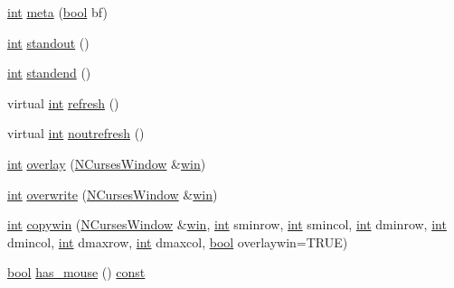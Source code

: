 \begin{DoxyCompactItemize}
\item 
\hyperlink{term__entry_8h_ad65b480f8c8270356b45a9890f6499ae}{int} \hyperlink{class_n_curses_window_a8e0a0dcfd1bd1648ea35724200664e4b}{meta} (\hyperlink{term__entry_8h_a002004ba5d663f149f6c38064926abac}{bool} bf)
\item 
\hyperlink{term__entry_8h_ad65b480f8c8270356b45a9890f6499ae}{int} \hyperlink{class_n_curses_window_ac6d8530fa9b03de2f08d8f24b70764b5}{standout} ()
\item 
\hyperlink{term__entry_8h_ad65b480f8c8270356b45a9890f6499ae}{int} \hyperlink{class_n_curses_window_ae66f15f4d0cfcc59374d5087d59211c2}{standend} ()
\item 
virtual \hyperlink{term__entry_8h_ad65b480f8c8270356b45a9890f6499ae}{int} \hyperlink{class_n_curses_window_a98862f6bbcabadb168dcf4b46d1369fc}{refresh} ()
\item 
virtual \hyperlink{term__entry_8h_ad65b480f8c8270356b45a9890f6499ae}{int} \hyperlink{class_n_curses_window_a8b2c23bf8acdada2b0dbb06f870009bb}{noutrefresh} ()
\item 
\hyperlink{term__entry_8h_ad65b480f8c8270356b45a9890f6499ae}{int} \hyperlink{class_n_curses_window_a94e231c3c169adcb377a5a7fa8ea1f16}{overlay} (\hyperlink{class_n_curses_window}{N\-Curses\-Window} \&\hyperlink{_ndk_8cpp_a3b51c79a7f111d2be9d347ac9bfe3abd}{win})
\item 
\hyperlink{term__entry_8h_ad65b480f8c8270356b45a9890f6499ae}{int} \hyperlink{class_n_curses_window_a93a33b695e6720f7a3a3bbd7c8c2c67b}{overwrite} (\hyperlink{class_n_curses_window}{N\-Curses\-Window} \&\hyperlink{_ndk_8cpp_a3b51c79a7f111d2be9d347ac9bfe3abd}{win})
\item 
\hyperlink{term__entry_8h_ad65b480f8c8270356b45a9890f6499ae}{int} \hyperlink{class_n_curses_window_a182aa3516f9c714b0d3cafd6c86dd958}{copywin} (\hyperlink{class_n_curses_window}{N\-Curses\-Window} \&\hyperlink{_ndk_8cpp_a3b51c79a7f111d2be9d347ac9bfe3abd}{win}, \hyperlink{term__entry_8h_ad65b480f8c8270356b45a9890f6499ae}{int} sminrow, \hyperlink{term__entry_8h_ad65b480f8c8270356b45a9890f6499ae}{int} smincol, \hyperlink{term__entry_8h_ad65b480f8c8270356b45a9890f6499ae}{int} dminrow, \hyperlink{term__entry_8h_ad65b480f8c8270356b45a9890f6499ae}{int} dmincol, \hyperlink{term__entry_8h_ad65b480f8c8270356b45a9890f6499ae}{int} dmaxrow, \hyperlink{term__entry_8h_ad65b480f8c8270356b45a9890f6499ae}{int} dmaxcol, \hyperlink{term__entry_8h_a002004ba5d663f149f6c38064926abac}{bool} overlaywin=T\-R\-U\-E)
\item 
\hyperlink{term__entry_8h_a002004ba5d663f149f6c38064926abac}{bool} \hyperlink{class_n_curses_window_a9e195787cefa106c10dde0409bbcd0da}{has\-\_\-mouse} () \hyperlink{term__entry_8h_a57bd63ce7f9a353488880e3de6692d5a}{const} 

\end{DoxyCompactItemize}
